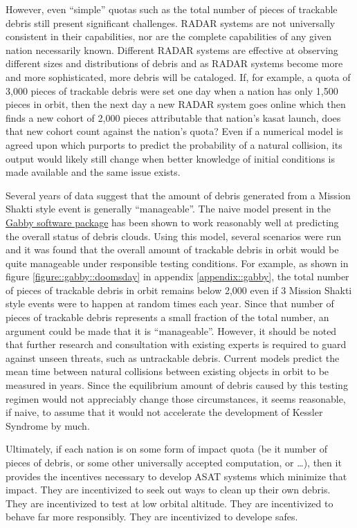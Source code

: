 However, even ``simple'' quotas such as the total number of pieces of
trackable debris still present significant challenges.  RADAR systems
are not universally consistent in their
capabilities\cite[T4]{cpl-oreilly}, nor are the complete capabilities
of any given nation necessarily known. Different RADAR systems are
effective at observing different sizes and distributions of debris and
as RADAR systems become more and more sophisticated, more debris will
be cataloged.  If, for example, a quota of 3,000 pieces of trackable
debris were set one day when a nation has only 1,500 pieces in orbit,
then the next day a new RADAR system goes online which then finds a
new cohort of 2,000 pieces attributable that nation's \ac{kasat}
launch, does that new cohort count against the nation's quota?  Even
if a numerical model is agreed upon which purports to predict the
probability of a natural collision, its output would likely still
change when better knowledge of initial conditions is made available
and the same issue exists.

Several years of data suggest that the amount of debris generated from
a Mission Shakti style event is generally ``manageable''.  The naive
model present in the
\href{https://github.com/harrison-caudill/gabby}{Gabby software
  package} has been shown to work reasonably well at predicting the
overall status of debris clouds.\cite{gabby} Using this model, several
scenarios were run and it was found that the overall amount of
trackable debris in orbit would be quite manageable under responsible
testing conditions.  For example, as shown in figure
\ref{figure::gabby::doomsday} in appendix \ref{appendix::gabby}, the
total number of pieces of trackable debris in orbit remains below
2,000 even if 3 Mission Shakti style events were to happen at random
times each year.  Since that number of pieces of trackable debris
represents a small fraction of the total number, an argument could be
made that it is ``manageable''.  However, it should be noted that
further research and consultation with existing experts is required to
guard against unseen threats, such as untrackable debris.  Current
models predict the mean time between natural collisions between
existing objects in orbit to be measured in
years.\cite[p6]{kessler-reunion} Since the equilibrium amount of
debris caused by this testing regimen would not appreciably change
those circumstances, it seems reasonable, if naive, to assume that it
would not accelerate the development of Kessler Syndrome by much.

Ultimately, if each nation is on some form of impact quota (be it
number of pieces of debris, or some other universally accepted
computation, or \ldots), then it provides the incentives necessary to
develop ASAT systems which minimize that impact.  They are
incentivized to seek out ways to clean up their own debris.  They are
incentivized to test at low orbital altitude.  They are incentivized
to behave far more responsibly.  They are incentivized to develope
\acp{safe}.

